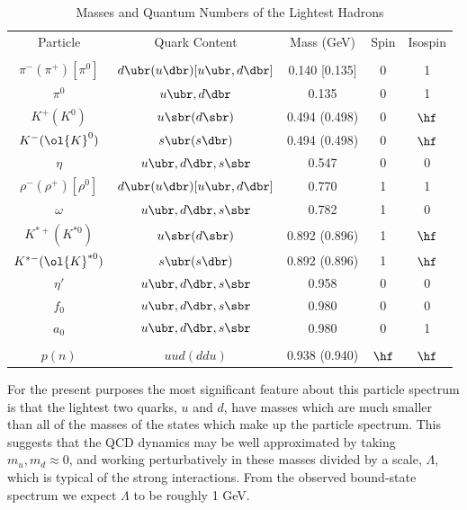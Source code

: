 \documentclass[12pt,epsf]{report}
\begin{document}
\begin{table}
\begin{center}
\begin{tabular}{ccccc}
Particle & Quark Content & Mass (GeV) 
& Spin & Isospin \\ &&&& \\
$\pi^- (\pi^+) [\pi^0]$ & $d \ubr (u \dbr) 
[u\ubr,d\dbr]$ & 0.140 [0.135]& 0 & 1 \\
$\pi^0$ & $u\ubr, d \dbr$ & 0.135 & 0 & 1 \\ 
$K^+ (K^0)$ & $u \sbr (d \sbr)$ &
0.494 (0.498) & 0 & $\hf$ \\
$K^- (\ol{K}^0)$ & $s \ubr (s \dbr)$ & 
0.494 (0.498) & 0 & $\hf$ \\
$\eta$ & $u \ubr, d \dbr, s\sbr$ & 0.547 & 0 & 0 \\ 
$\rho^- (\rho^+) [\rho^0]$
& $d \ubr (u \dbr) [u\ubr, d\dbr]$ & 0.770 & 1 &
1 \\
$\omega$ & $u \ubr, d \dbr, s\sbr$ & 0.782 & 1 & 0 \\  
$K^{*+} (K^{*0})$ & $u
\sbr (d \sbr)$ & 0.892 (0.896) & 1 & $\hf$ \\
$K^{*-} (\ol{K}^{*0})$ & $s \ubr (s \dbr)$ 
& 0.892 (0.896) & 1 & $\hf$ \\
$\eta'$ & $u \ubr, d \dbr, s\sbr$ & 0.958 & 0 & 0 \\  
$f_0$ & $u \ubr, d \dbr,
s\sbr$ & 0.980 & 0 & 0 \\  $a_0$ & $u \ubr, 
d \dbr, s\sbr$ & 0.980 & 0 & 1 \\
&&&& \\
$p (n)$ & $uud (ddu)$ & 0.938 (0.940) & $\hf$ & $\hf$ \\ 
\end{tabular}
\caption{Masses and Quantum Numbers of the Lightest
Hadrons} \end{center}
\end{table}

For the present purposes the most significant feature about
this particle spectrum is that the lightest two quarks, $u$
and $d$, have masses which are much smaller than all of the
masses of the states which make up the particle spectrum.
This suggests that the QCD dynamics may be well
approximated by taking $m_u , 
m_d \approx 0$, and working perturbatively in these masses
divided by a scale, $\Lambda$, which is typical of the
strong interactions. {}From the observed bound-state
spectrum we expect $\Lambda$ to be roughly 1 GeV.
\end{document}
